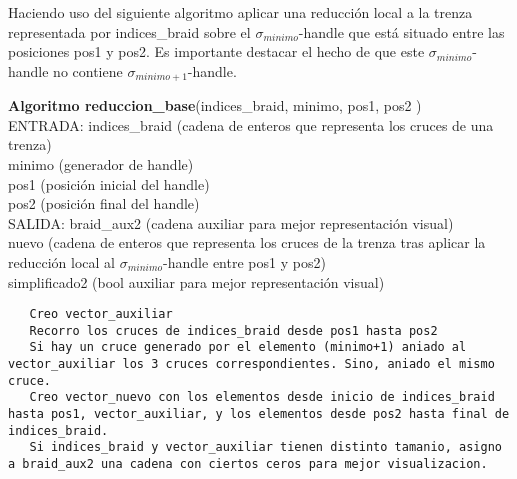 \newpage
Haciendo uso del siguiente algoritmo aplicar una reducción local a la trenza representada por indices\_braid sobre el $\sigma_{minimo}$-handle que está situado entre las posiciones pos1 y pos2. Es importante destacar el hecho de que este $\sigma_{minimo}$-handle  no contiene $\sigma_{minimo+1}$-handle.
\begin{alg}
	\textbf{Algoritmo reduccion\_base}(indices\_braid, minimo, pos1, pos2 )\\
	ENTRADA: indices\_braid (cadena de enteros que representa los cruces de una trenza)\\
	\hspace*{2.2cm} minimo (generador de handle) \\
	\hspace*{2.2cm} pos1 (posición inicial del handle) \\
	\hspace*{2.2cm} pos2 (posición final del handle)\\
	SALIDA: \hspace{0.4cm} braid\_aux2 (cadena auxiliar para mejor representación visual) \\
	\hspace*{2.2cm} nuevo (cadena de enteros que representa los cruces de la trenza tras aplicar la reducción local al $\sigma_{minimo}$-handle entre pos1 y pos2)\\
	\hspace*{2.2cm} simplificado2 (bool auxiliar para mejor representación visual)
	
\begin{lstlisting}
   Creo vector_auxiliar
   Recorro los cruces de indices_braid desde pos1 hasta pos2
   Si hay un cruce generado por el elemento (minimo+1) aniado al vector_auxiliar los 3 cruces correspondientes. Sino, aniado el mismo cruce. 
   Creo vector_nuevo con los elementos desde inicio de indices_braid hasta pos1, vector_auxiliar, y los elementos desde pos2 hasta final de indices_braid.
   Si indices_braid y vector_auxiliar tienen distinto tamanio, asigno a braid_aux2 una cadena con ciertos ceros para mejor visualizacion.
\end{lstlisting}
\end{alg}


